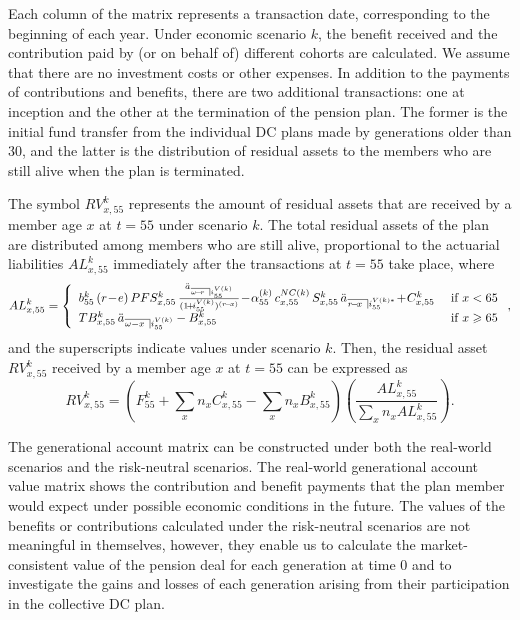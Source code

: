 \documentclass{sfuthesis}
\numberwithin{equation}{chapter}
\begin{document}
	
		\justify
		Each column of the matrix represents a transaction date, corresponding to the beginning of each year. Under economic scenario $k$, the benefit received and the contribution paid by (or on behalf of) different cohorts are calculated. We assume that there are no investment costs or other expenses. In addition to the payments of contributions and benefits, there are two additional transactions: one at inception and the other at the termination of the pension plan. The former is the initial fund transfer from the individual DC plans made by generations older than 30, and the latter is the distribution of residual assets to the members who are still alive when the plan is terminated. 
	
	
		\justify
		The symbol $RV_{x,55}^k$ represents the amount of residual assets that are received by a member age $x$ at $t=55$ under scenario $k$. The total residual assets of the plan are distributed among members who are still alive, proportional to the actuarial liabilities $AL_{x,55}^{k}$ immediately after the transactions at $t=55$ take place, where
		\begin{equation}
		\label{eq:VB_8}
		AL_{x,55}^k = \left\{
		\begin{array}{ll}
		b_{55}^{k}\,(r\!-\!e) \, PFS^{k}_{x,55} \, \frac{\ddot{a}_{\angl{\omega\! -\! r }i^{V(k)}_{55}}}{(1\!+\!i^{V(k)}_{55})^{(r\!-\!x)}}\!-\! \alpha_{55}^{(k)}\, c_{x,55}^{NC(k)} \, S_{x,55}^k \, \ddot{a}_{\angl{r\! -\! x }i^{V(k)*}_{55}}\! +\! C_{x,55}^k &\text{ if } x<65 \\
		TB_{x,55}^{k}\, \ddot{a}_{\angl{\omega - x }i^{V(k)}_{55}} - B_{x,55}^{k} &\text{ if } x\geqslant 65\\
		\end{array}
		\right.,
		\end{equation}
		and the superscripts indicate values under scenario $k$. Then, the residual asset $RV_{x,55}^k$ received by a member age $x$ at $t=55$ can be expressed as
		\begin{equation}
		\label{eq:VB_9}
		RV_{x,55}^k = \left(F_{55}^k + \sum_{x} n_{x}C_{x,55}^k -\sum_{x} n_{x}B_{x,55}^k \right) \left( \frac{AL_{x,55}^{k}}{\sum_{x} n_{x} AL_{x,55}^{k} } \right).
		\end{equation}
	
	
		\justify
		The generational account matrix can be constructed under both the real-world scenarios and the risk-neutral scenarios. The real-world generational account value matrix shows the contribution and benefit payments that the plan member would expect under possible economic conditions in the future. The values of the benefits or contributions calculated under the risk-neutral scenarios are not meaningful in themselves, however, they enable us to calculate the market-consistent value of the pension deal for each generation at time $0$ and to investigate the gains and losses of each generation arising from their participation in the collective DC plan.
	
\end{document}
